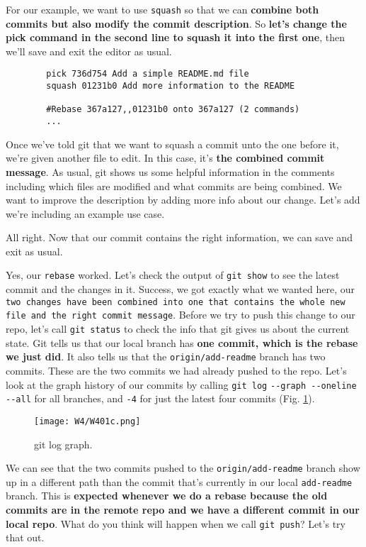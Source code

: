 	For our example, we want to use \texttt{squash} so that we can \textbf{combine both commits but also modify the commit description}. So \textbf{let's change the pick command in the second line to squash it into the first one}, then we'll save and exit the editor as usual.
	
	\begin{verbatim}
		pick 736d754 Add a simple README.md file
		squash 01231b0 Add more information to the README
		
		#Rebase 367a127,,01231b0 onto 367a127 (2 commands)
		... 
	\end{verbatim}
	
	Once we've told git that we want to squash a commit unto the one before it, we're given another file to edit. In this case, it's \textbf{the combined commit message}. As usual, git shows us some helpful information in the comments including which files are modified and what commits are being combined. We want to improve the description by adding more info about our change. Let's add we're including an example use case.
	
	All right. Now that our commit contains the right information, we can save and exit as usual.
	
	Yes, our \texttt{rebase} worked. Let's check the output of \texttt{git show} to see the latest commit and the changes in it. Success, we got exactly what we wanted here, our \texttt{two changes have been combined into one that contains the whole new file and the right commit message}. Before we try to push this change to our repo, let's call \texttt{git status} to check the info that git gives us about the current state. Git tells us that our local branch has \textbf{one commit, which is the rebase we just did}. It also tells us that the \verb|origin/add-readme| branch has two commits. These are the two commits we had already pushed to the repo. Let's look at the graph history of our commits by calling \texttt{git log} \verb|--graph --oneline --all| for all branches, and \verb|-4| for just the latest four commits (Fig. \ref{W401c}). 
	
	\begin{figure} 
		\caption{git log graph.}
		\centering
		\texttt{[image: W4/W401c.png]}
		\label{W401c}
	\end{figure}

	We can see that the two commits pushed to the \verb|origin/add-readme| branch show up in a different path than the commit that's currently in our local \verb|add-readme| branch. This is \textbf{expected whenever we do a rebase because the old commits are in the remote repo and we have a different commit in our local repo}. What do you think will happen when we call \texttt{git push}? Let's try that out.
	
